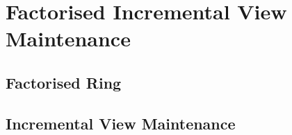 \chapter{Factorised Incremental View Maintenance}

\section{Factorised Ring}
\section{Incremental View Maintenance}

